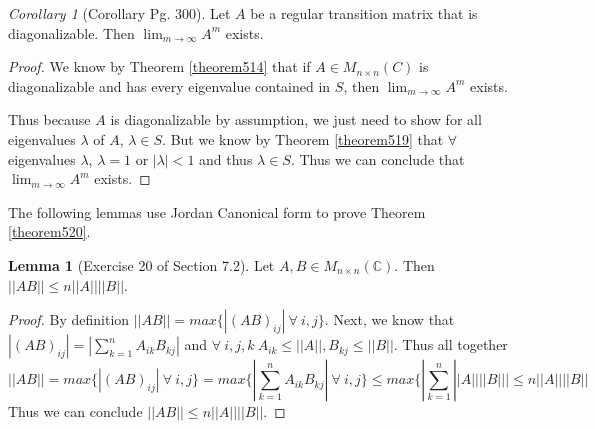 \documentclass{amsart}
\theoremstyle{definition}
\newtheorem{lemma}[theorem]{Lemma}
\theoremstyle{remark}
\newtheorem{corollary}{Corollary}[theorem]
\numberwithin{equation}{section}
\begin{document}
\begin{corollary}[Corollary Pg. 300]\label{cor519}
Let $A$ be a regular transition matrix that is diagonalizable.
Then $\lim_{m \to \infty} A^m$ exists.

\end{corollary}

\begin{proof}

We know by Theorem \ref{theorem514} that if $A \in M_{n \times n}(C)$ is diagonalizable and has every eigenvalue contained in $S$, then $\lim_{m \to \infty} A^m$ exists.


Thus because $A$ is diagonalizable by assumption, we just need to show for all eigenvalues $\lambda$ of $A$, $\lambda \in S$.
But we know by Theorem \ref{theorem519} that $\forall$ eigenvalues $\lambda$, $\lambda = 1$ or $|\lambda| < 1$ and thus $\lambda \in S$.
Thus we can conclude that $\lim_{m \to \infty} A^m$ exists.

\end{proof}



The following lemmas use Jordan Canonical form to prove Theorem \ref{theorem520}.

\begin{lemma}[Exercise 20 of Section 7.2]
Let $A, B \in M_{n \times n}(\mathbb{C})$.
Then $||AB|| \leq n ||A|| ||B||$.

\end{lemma}


\begin{proof}
	By definition $||AB|| = max \{|(AB)_{ij}|\ \forall\ i, j \}$.
	Next, we know that $|(AB)_{ij}|  = |\sum_{k = 1}^nA_{ik}B_{kj}|$ and 
	$\forall\ i, j, k\ A_{ik} \leq ||A||,  B_{kj} \leq ||B||$.
	Thus all together 
	$$ ||AB|| = max \{|(AB)_{ij}|\ \forall\ i, j \} = max \{|\sum_{k = 1}^nA_{ik}B_{kj}|\ \forall\ i, j \} \leq max \{|\sum_{k = 1}^n||A||||B||| \leq n||A||||B||$$
	Thus we can conclude $||AB|| \leq n||A||||B||$.

\end{proof}
\end{document}
